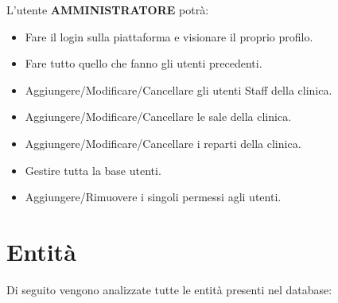 \documentclass[paper=a4, fontsize=11pt,x11names]{report}
\begin{document}
L'utente \textbf{AMMINISTRATORE} potrà:
\begin{itemize}
\item Fare il login sulla piattaforma e visionare il proprio profilo.
\item Fare tutto quello che fanno gli utenti precedenti.
\item Aggiungere/Modificare/Cancellare gli utenti Staff della clinica.
\item Aggiungere/Modificare/Cancellare le sale della clinica.
\item Aggiungere/Modificare/Cancellare i reparti della clinica.
\item Gestire tutta la base utenti.
\item Aggiungere/Rimuovere i singoli permessi agli utenti.
\end{itemize}

\section{Entità}
Di seguito vengono analizzate tutte le entità presenti nel database:


\end{document}
